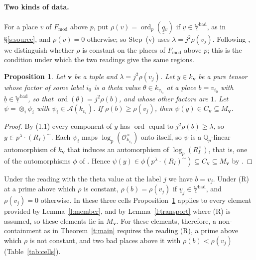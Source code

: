 \documentclass[11pt]{amsart}
\newtheorem{proposition}[theorem]{Proposition}
\theoremstyle{remark}
\newcommand{\Qp}{\mathbb Q_p}
\newcommand{\cO}{\mathcal O}
\newcommand{\cA}{\mathcal A}
\newcommand{\qq}{\underline{\underline{q}}{}}
\newcommand{\Fmod}{F_{\mathrm{mod}}}
\newcommand{\Vbad}{\underline{\mathbb V}^{\mathrm{bad}}}
\newcommand{\RIt}{(R_I)^{\sim}}
\newcommand{\bv}{\mathbf v}
\begin{document}
\smallskip
\paragraph{Two kinds of data.}
For a place $v$ of $\Fmod$ above $p$, put $\rho(v)=\operatorname{ord}_p(\qq_v)$ if $\underline v\in\Vbad$,
as in \S\ref{s:source}, and $\rho(v)=0$ otherwise; so Step~(v) uses $\lambda=j^2\rho(v_j)$. Following
\cite{LANAiut}, we distinguish whether $\rho$ is constant on the places of $\Fmod$ above $p$; this is the
condition under which the two readings give the same regions.

\begin{proposition}\label{p:cells}
Let $\bv$ be a tuple and $\lambda=j^2\rho(v_j)$. Let $y\in k_{\bv}$ be a pure tensor whose factor of some
label $i_0$ is a theta value $\theta\in k_{v_{i_0}}$ at a place $b=v_{i_0}$ with $\underline b\in\Vbad$, so that
$\operatorname{ord}(\theta)=j^2\rho(b)$, and whose other factors are $1$. Let $\psi=\otimes_i\psi_i$ with
$\psi_i\in\cA(k_{v_i})$. If $\rho(b)\ge\rho(v_j)$, then $\psi(y)\in C_{\bv}\subseteq M_{\bv}$.
\end{proposition}

\begin{proof}
By (1.1) every component of $y$ has $\operatorname{ord}$ equal to $j^2\rho(b)\ge\lambda$, so
$y\in p^\lambda\cdot\RIt$. Each $\psi_i$ maps $\log_p(\cO_{k_{v_i}}^\times)$ onto itself, so $\psi$ is a
$\Qp$-linear automorphism of $k_{\bv}$ that induces an automorphism of $\log_p(R_I^\times)$, that is, one of the
automorphisms $\phi$ of \cite[Prop.~1.2]{IUT4}. Hence
$\psi(y)\in\phi(p^\lambda\cdot\RIt)\subseteq C_{\bv}\subseteq M_{\bv}$ by \cite[Prop.~1.2(ii), p.~10]{IUT4}.
\end{proof}

Under the reading with the theta value at the label $j$ we have $b=v_j$. Under \textup{(R)} at a prime above
which $\rho$ is constant, $\rho(b)=\rho(v_j)$ if $\underline v_j\in\Vbad$, and $\rho(v_j)=0$ otherwise. In these three cells
Proposition~\ref{p:cells} applies to every element provided by Lemma~\ref{l:member}, and by
Lemma~\ref{l:transport} where \textup{(R)} is assumed, so these elements lie in $M_{\bv}$. For these
elements, therefore, a non-containment as in Theorem~\ref{t:main} requires the reading
\textup{(R)}, a prime above which $\rho$ is not constant, and two bad places above it with $\rho(b)<\rho(v_j)$
(Table~\ref{tab:cells}).
\end{document}
